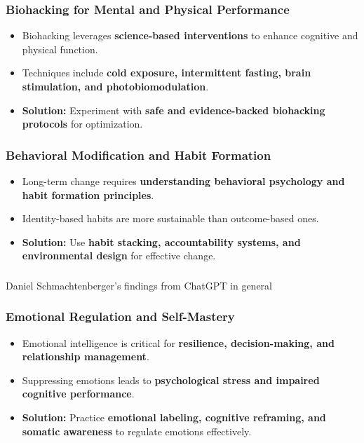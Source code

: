 \begin{frame}[fragile]\frametitle{Biohacking for Mental and Physical Performance}
	\begin{itemize}
	\item Biohacking leverages \textbf{science-based interventions} to enhance cognitive and physical function.
	\item Techniques include \textbf{cold exposure, intermittent fasting, brain stimulation, and photobiomodulation}.
	\item \textbf{Solution:} Experiment with \textbf{safe and evidence-backed biohacking protocols} for optimization.
	\end{itemize}
\end{frame}

\begin{frame}[fragile]\frametitle{Behavioral Modification and Habit Formation}
	\begin{itemize}
	\item Long-term change requires \textbf{understanding behavioral psychology and habit formation principles}.
	\item Identity-based habits are more sustainable than outcome-based ones.
	\item \textbf{Solution:} Use \textbf{habit stacking, accountability systems, and environmental design} for effective change.
	\end{itemize}
\end{frame}

\begin{frame}[fragile]\frametitle{}
\begin{center}
{\Large Daniel Schmachtenberger's findings from ChatGPT in general}

\end{center}
\end{frame}


\begin{frame}[fragile]\frametitle{Emotional Regulation and Self-Mastery}
	\begin{itemize}
	\item Emotional intelligence is critical for \textbf{resilience, decision-making, and relationship management}.
	\item Suppressing emotions leads to \textbf{psychological stress and impaired cognitive performance}.
	\item \textbf{Solution:} Practice \textbf{emotional labeling, cognitive reframing, and somatic awareness} to regulate emotions effectively.
	\end{itemize}
\end{frame}

